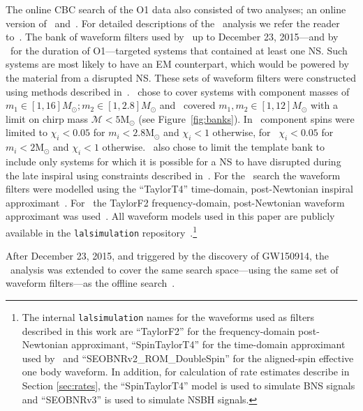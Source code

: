The online \ac{CBC} search of the \ac{O1} data also consisted of two analyses;
an online version of \gstlal\,\citep{Messick:2016aqy} and \mbta\,\citep{Adams:2015ulm}.
For detailed descriptions of the \mbta\ analysis we refer the reader to~\citep{Beauville:2007kp,Virgo:2011aa,Adams:2015ulm}.
The bank of waveform filters used by \gstlal\ up to December 23, 2015---and by
\mbta\ for the duration of \ac{O1}---targeted systems that contained at least one \ac{NS}.
Such systems are most likely to have an \ac{EM} counterpart, which would
be powered by the material from a disrupted \ac{NS}.
These sets of waveform filters were constructed using methods described
in~\citep{Brown:2012qf,Harry:2013tca,Pannarale:2014rea}. \gstlal\ chose to cover systems with component masses of
$m_1 \in [1,16] M_{\odot}; m_2 \in [1,2.8] M_{\odot}$ and \mbta\ covered $m_1, m_2 \in [1,12] M_{\odot}$ with
a limit on chirp mass $\mathcal{M} < 5\mathrm{M}_{\odot}$ (see Figure~\ref{fig:banks}). In \gstlal\ component spins were
limited to $\chi_{i} < 0.05$ for $m_{i} < 2.8\mathrm{M}_{\odot}$ and $\chi_{i} < 1$ otherwise, for
\mbta\ $\chi_{i} < 0.05$ for $m_{i} < 2\mathrm{M}_{\odot}$ and $\chi_{i} < 1$ otherwise.
\gstlal\ also chose to limit the template bank to include only systems for which it is possible for
a \ac{NS} to have disrupted during the late inspiral using constraints described
in~\citep{Pannarale:2014rea}. For the \mbta\ search the waveform filters were modelled using the
``TaylorT4'' time-domain, post-Newtonian inspiral approximant~\citep{Buonanno:2009zt}.
For \gstlal\
the TaylorF2 frequency-domain, post-Newtonian waveform approximant was
used~\citep{Arun:2008kb,Bohe:2013cla,Blanchet:2013haa,Bohe:2015ana,Mishra:2016whh}.
All waveform models used in this paper are publicly available
in the \texttt{lalsimulation} repository~\citep{LAL}.\footnote{The
  internal \texttt{lalsimulation} names for the waveforms used as filters
  described in this work are ``TaylorF2'' for the frequency-domain post-Newtonian
  approximant, ``SpinTaylorT4'' for the time-domain
  approximant used by \mbta\ and ``SEOBNRv2\_ROM\_DoubleSpin'' for the
  aligned-spin effective one body waveform.
  In addition, for calculation of rate estimates describe in Section \ref{sec:rates},
  the ``SpinTaylorT4'' model is used to simulate BNS signals and
  ``SEOBNRv3'' is used to simulate NSBH signals.}

After December 23, 2015, and triggered by the discovery of GW150914, the \gstlal\
analysis was extended to cover the same search space---using
the same set of waveform filters---as the offline search~\citep{Capano:2016dsf,TheLIGOScientific:2016pea}.

